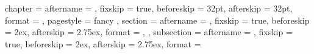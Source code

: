 \ctexset
  {
    chapter    =
      {
        aftername  = \hspace{.5\ccwd}, fixskip   = true,
        beforeskip = 32pt,             afterskip = 32pt,
        format     = \sffamily\centering\semiLarge,
        pagestyle  = fancy
      },
    section    =
      {
        aftername  = \hspace{.5\ccwd}, fixskip   = true,
        beforeskip = 2ex,              afterskip = 2.75ex,
        format = \sffamily\large
         ,
      },
    subsection =
      {
        aftername  = \hspace{.5\ccwd}, fixskip   = true,
        beforeskip = 2ex,           afterskip = 2.75ex,
        format     = \sffamily\semilarge
      }
  }

\makeatother \ExplSyntaxOff
\endinput
